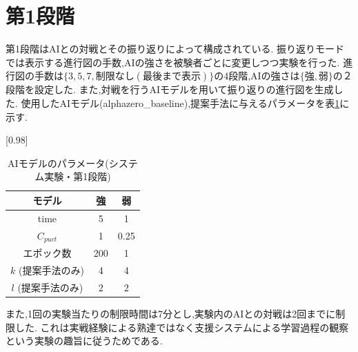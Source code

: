 \section{第1段階}
第1段階はAIとの対戦とその振り返りによって構成されている.
振り返りモードでは表示する進行図の手数,AIの強さを被験者ごとに変更しつつ実験を行った.
進行図の手数は$\{3, 5, 7, 制限なし(最後まで表示)\}$の4段階,AIの強さは$\{強,弱\}$の２段階を設定した.
また,対戦を行うAIモデルを用いて振り返りの進行図を生成した.
使用したAIモデル(alphazero\_baseline),提案手法に与えるパラメータを表\ref{table:param-system}に示す.
\begin{table}[H]
	\caption{AIモデルのパラメータ(システム実験・第1段階)}
    \label{table:param-system}
	\centering
	\scalebox{0.98}[0.98]{
		\begin{tabular}{c|c|c}
			モデル&強&弱\\\hline
			time    & 5 & 1 \\ 
			$C_{puct}$ & 1   & 0.25 \\
            エポック数 & 200 & 1 \\
			$k$ (提案手法のみ)     & 4 & 4 \\
			$l$ (提案手法のみ)     & 2 & 2 \\

		\end{tabular}
	}
	
\end{table}
また,1回の実験当たりの制限時間は7分とし,実験内のAIとの対戦は2回までに制限した.
これは実戦経験による熟達ではなく支援システムによる学習過程の観察という実験の趣旨に従うためである.
